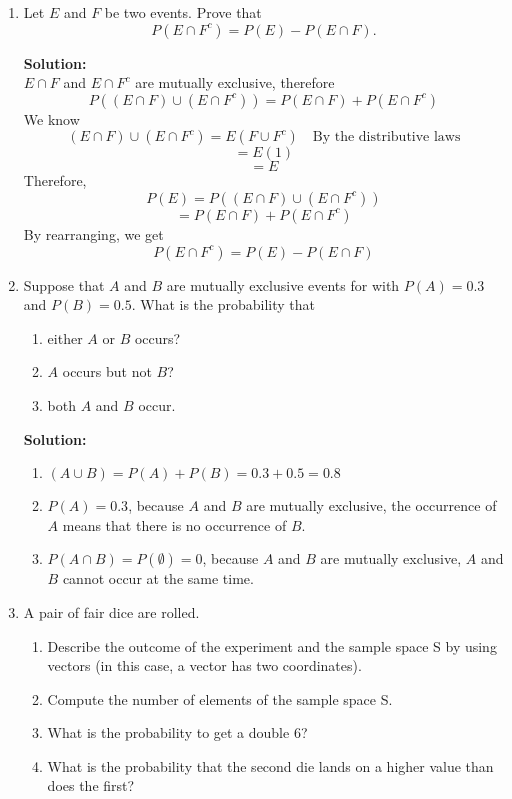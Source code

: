 \documentclass{report}
\begin{document}
\begin{enumerate}


\item Let $E$ and $F$ be two events. Prove that
\[
  {P}(E\cap F^c)=P(E)-P(E\cap F). 
\]

{\bf Solution:}\\
    $E\cap F$ and $E\cap F^c$ are mutually exclusive, therefore
    $$P((E\cap F) \cup (E \cap F^c))=P(E\cap F)+P(E\cap F^c)$$
    We know
    $$(E\cap F)\cup(E\cap F^c)=E(F\cup F^c)\quad \text{By the distributive laws}$$
    $$=E(1)$$
    $$=E$$
    Therefore,
    $$P(E)=P((E\cap F)\cup(E\cap F^c))$$
    $$=P(E\cap F)+P(E\cap F^c)$$
    By rearranging, we get
    $$P(E\cap F^c)=P(E)-P(E\cap F)$$


\item Suppose that $A$ and $B$ are mutually exclusive events for with $P(A)=0.3$ and $P(B)=0.5$. What is the probability that
\begin{enumerate}
	\item either $A$ or $B$ occurs?
	\item $A$ occurs but not $B$?
	\item both $A$ and $B$ occur. 
\end{enumerate}

{\bf Solution:}
\begin{enumerate}
    \item $(A\cup B)=P(A)+P(B)=0.3+0.5=0.8$
    \item $P(A)=0.3$, because $A$ and $B$ are mutually exclusive, the occurrence of $A$ means that there is no occurrence of $B$.
    \item $P(A\cap B)=P(\emptyset)=0$, because $A$ and $B$ are mutually exclusive, $A$ and $B$ cannot occur at the same time.
\end{enumerate}


\item A pair of fair dice are rolled.
\begin{enumerate}
    \item Describe the outcome of the experiment and the sample space S by using vectors (in this case, a vector has two coordinates).
    \item Compute the number of elements of the sample space S.
    \item What is the probability to get a double 6?
    \item What is the probability that the second die lands on a higher value than does the first?


\end{enumerate}
\end{enumerate}
\end{document}
